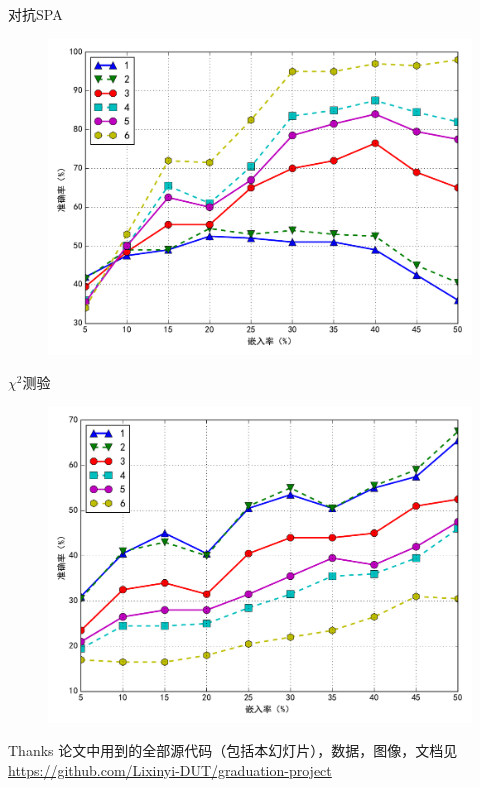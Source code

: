 \documentclass[14pt]{Bredelebeamer}
\begin{document}
\begin{frame}{对抗SPA}
	\begin{figure}
		\includegraphics[width=.9\textwidth]{images/spaprediction}
	\end{figure}
\end{frame}

\begin{frame}{$\chi^2$测验}
	\begin{figure}
		\includegraphics[width=.9\textwidth]{images/chi2prediction}
	\end{figure}
\end{frame}

\begin{frame}{Thanks}
	\centering
	论文中用到的全部源代码（包括本幻灯片），数据，图像，文档见\\
	\faChain \url{https://github.com/Lixinyi-DUT/graduation-project}
\end{frame}
\end{document}
